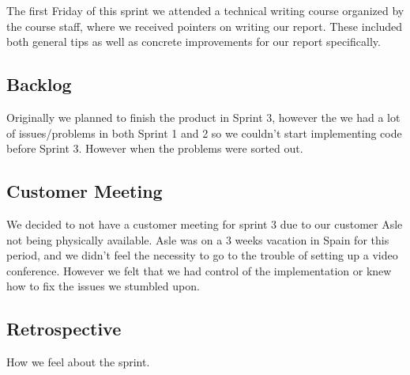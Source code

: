 The first Friday of this sprint we attended a technical writing course organized by the course staff, where we received pointers on writing our report. These included both general tips as well as concrete improvements for our report specifically.

\subsection{Backlog}
Originally we planned to finish the product in Sprint 3, however the we had a lot of issues/problems in both Sprint 1 and 2 so we couldn't start implementing code before Sprint 3. However when the problems were sorted out.

\subsection{Customer Meeting}
We decided to not have a customer meeting for sprint 3 due to our customer Asle not being physically available. Asle was on a 3 weeks vacation in Spain for this period, and we didn't feel the necessity to go to the trouble of setting up a video conference.
However we felt that we had control of the implementation or knew how to fix the issues we stumbled upon.

\subsection{Retrospective}
How we feel about the sprint.